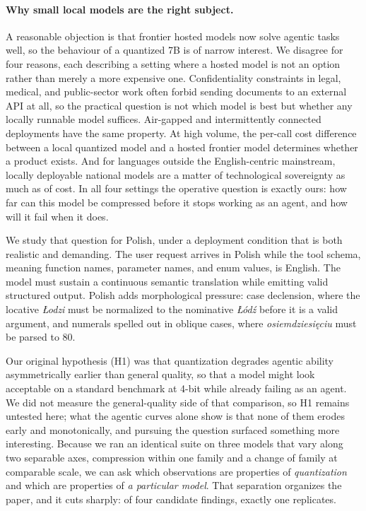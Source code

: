 \documentclass[11pt]{article}
\begin{document}
\paragraph{Why small local models are the right subject.} A reasonable objection is that frontier hosted models now solve agentic tasks well, so the behaviour of a quantized 7B is of narrow interest. We disagree for four reasons, each describing a setting where a hosted model is not an option rather than merely a more expensive one. Confidentiality constraints in legal, medical, and public-sector work often forbid sending documents to an external API at all, so the practical question is not which model is best but whether any locally runnable model suffices. Air-gapped and intermittently connected deployments have the same property. At high volume, the per-call cost difference between a local quantized model and a hosted frontier model determines whether a product exists. And for languages outside the English-centric mainstream, locally deployable national models are a matter of technological sovereignty as much as of cost. In all four settings the operative question is exactly ours: how far can this model be compressed before it stops working as an agent, and how will it fail when it does.

We study that question for Polish, under a deployment condition that is both realistic and demanding. The user request arrives in Polish while the tool schema, meaning function names, parameter names, and enum values, is English. The model must sustain a continuous semantic translation while emitting valid structured output. Polish adds morphological pressure: case declension, where the locative \emph{Łodzi} must be normalized to the nominative \emph{Łódź} before it is a valid argument, and numerals spelled out in oblique cases, where \emph{osiemdziesięciu} must be parsed to 80.

Our original hypothesis (H1) was that quantization degrades agentic ability asymmetrically earlier than general quality, so that a model might look acceptable on a standard benchmark at 4-bit while already failing as an agent. We did not measure the general-quality side of that comparison, so H1 remains untested here; what the agentic curves alone show is that none of them erodes early and monotonically, and pursuing the question surfaced something more interesting. Because we ran an identical suite on three models that vary along two separable axes, compression within one family and a change of family at comparable scale, we can ask which observations are properties of \emph{quantization} and which are properties of \emph{a particular model}. That separation organizes the paper, and it cuts sharply: of four candidate findings, exactly one replicates.
\end{document}
